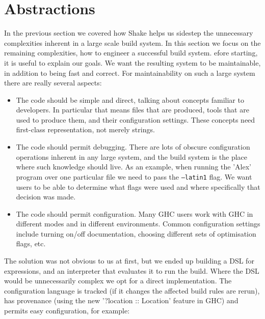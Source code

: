 \section{Abstractions\label{sec:abstractions}}


In the previous section we covered how Shake helps us sidestep the unnecessary
complexities inherent in a large scale build system. In this section we focus on
the remaining complexities, how to engineer a successful build system. efore
starting, it is useful to explain our goals. We want the resulting system to be
maintainable, in addition to being fast and correct. For maintainability on such
a large system there are really several aspects:

\begin{itemize}
\item The code should be simple and direct, talking about concepts familiar to
developers. In particular that means files that are produced, tools that are
used to produce them, and their configuration settings. These concepts
need first-class representation, not merely strings.
\item The code should permit debugging. There are lots of obscure configuration
operations inherent in any large system, and the build system is the place where
such knowledge should live. As an example, when running the \lst'Alex'
program over one particular file we need to pass the \texttt{--latin1} flag. We
want users to be able to determine what flags were used and where specifically
that decision was made.
\item The code should permit configuration. Many GHC users work with GHC in
different modes and in different environments. Common configuration settings
include turning on/off documentation, choosing different sets of optimisation flags,
etc.
\end{itemize}

The solution was not obvious to us at first, but we ended up building a DSL for
expressions, and an interpreter that evaluates it to run the build. Where the
DSL would be unnecessarily complex we opt for a direct implementation. The
configuration language is tracked (if it changes the affected build rules are
rerun), has provenance (using the new \lst'?location :: Location' feature in
GHC) and permits easy configuration, for example:

